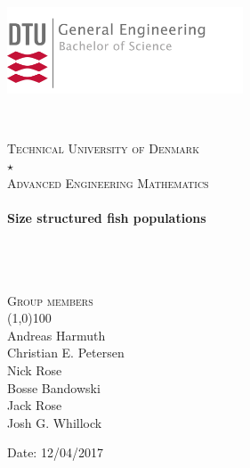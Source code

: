 \documentclass{article}
\newcommand{\mystar}{{\fontfamily{lmr}\selectfont$\star$}}
\begin{document}

\begin{titlepage}
	\begin{flushleft}
	\vspace*{-3.5cm}
	\hspace*{-3 cm}
		\includegraphics[width=7cm]{pictures/Logo.png} %
	\end{flushleft}
	\textsc{\Large}\\
	[2cm]
	\begin{center}
	\textsc{\large 	Technical University of Denmark}\\
	[0.5cm]
	\textsc{\LARGE \mystar} \\
	[0.5cm]
	\textsc{\LARGE Advanced Engineering Mathematics}\\
	[2cm]
	\noindent\makebox[\linewidth]{\rule{\paperwidth}{1.5 pt}}\\
	[5mm]
	\huge{\bfseries Size structured fish populations} \\
	[0.2 cm]

	\noindent\makebox[\linewidth]{\rule{\paperwidth}{1.5 pt}}\\
	[-0.75 cm]
	\noindent\makebox[\linewidth]{\rule{\paperwidth}{0.5 pt}}\\

	\textsc{\Large}\\
	[3cm]
	\end{center}
	\begin{flushright}
	\textsc{\large Group members\\}
	\line(1,0){100}\\
	Andreas Harmuth \\
	Christian E. Petersen\\
	Nick Rose\\
	Bosse Bandowski\\
	Jack Rose\\
	Josh G. Whillock\\
	[1cm]
	\end{flushright}
	
	\begin{center}
		Date: 12/04/2017
	\end{center}
\end{titlepage}
\end{document}
